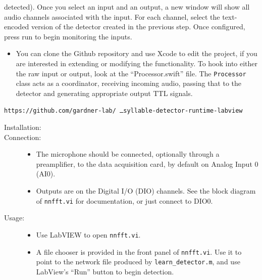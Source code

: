 \documentclass[10pt,letterpaper]{article}
\providecommand{\DIFaddtex}[1]{{\protect\color{blue}\uwave{#1}}} %
\providecommand{\DIFdeltex}[1]{{\protect\color{red}\sout{#1}}}                      %
\providecommand{\DIFaddbegin}{} %
\providecommand{\DIFaddend}{} %
\providecommand{\DIFdelbegin}{} %
\providecommand{\DIFdelend}{} %
\providecommand{\DIFadd}[1]{\texorpdfstring{\DIFaddtex{#1}}{#1}} %
\providecommand{\DIFdel}[1]{\texorpdfstring{\DIFdeltex{#1}}{}} %
\newcommand{\DIFscaledelfig}{0.5}
\newlength{\DIFdelgraphicswidth} %
\newlength{\DIFdelgraphicsheight} %
\newcommand{\DIFaddincludegraphics}[2][]{{\color{blue}\fbox{\DIFOincludegraphics[#1]{#2}}}} %
\newcommand{\DIFdelincludegraphics}[2][]{%
\sbox{\DIFdelgraphicsbox}{\DIFOincludegraphics[#1]{#2}}%
\settoboxwidth{\DIFdelgraphicswidth}{\DIFdelgraphicsbox} %
\settoboxtotalheight{\DIFdelgraphicsheight}{\DIFdelgraphicsbox} %
\scalebox{\DIFscaledelfig}{%
\parbox[b]{\DIFdelgraphicswidth}{\usebox{\DIFdelgraphicsbox}\\[-\baselineskip] \rule{\DIFdelgraphicswidth}{0em}}\llap{\resizebox{\DIFdelgraphicswidth}{\DIFdelgraphicsheight}{%
\setlength{\unitlength}{\DIFdelgraphicswidth}%
\begin{picture}(1,1)%
\thicklines\linethickness{2pt} %
{\color[rgb]{1,0,0}\put(0,0){\framebox(1,1){}}}%
{\color[rgb]{1,0,0}\put(0,0){\line( 1,1){1}}}%
{\color[rgb]{1,0,0}\put(0,1){\line(1,-1){1}}}%
\end{picture}%
}\hspace*{3pt}}} %
} %
\DeclareRobustCommand{\DIFaddbegin}{\DIFOaddbegin \let\includegraphics\DIFaddincludegraphics} %
\DeclareRobustCommand{\DIFaddend}{\DIFOaddend \let\includegraphics\DIFOincludegraphics} %
\DeclareRobustCommand{\DIFdelbegin}{\DIFOdelbegin \let\includegraphics\DIFdelincludegraphics} %
\DeclareRobustCommand{\DIFdelend}{\DIFOaddend \let\includegraphics\DIFOincludegraphics} %
\begin{document}
\begin{description}
\begin{description}
\begin{description}
\begin{itemize}
      detected). Once you select an input and an output, a new window will show all audio 
      channels associated with the input. For each channel, select the text-encoded version of 
      the detector created in the previous step. Once configured, press run to begin 
      monitoring the inputs.
      \end{itemize}
    \item[Customisation:]\hfill
      \begin{itemize}
      \item You can clone the Github repository and use Xcode to edit the project, if you 
      are interested in extending or modifying the functionality. To hook into either 
      the raw input or output, look at the ``Processor.swift'' file. The 
      {\tt Processor} class acts as a coordinator, receiving incoming audio, passing that
      to the detector and generating appropriate output TTL signals.
      \end{itemize}
    \end{description}
    \DIFaddbegin 

  \DIFaddend \item[LabVIEW:]\DIFaddbegin \hfill
    \begin{trivlist}
    \item \DIFaddend {\tt https://github.com/gardner-lab/\DIFdelbegin %
\DIFdel{\ }\DIFdelend syllable-detector-runtime-labview}
    \DIFaddbegin \item \DIFadd{10.5281/zenodo.437558 
    }\end{trivlist}
    \DIFaddend \begin{description}
    \item[Installation:]\hfill
    \item[Connection:]\hfill
      \begin{itemize}
      \item The microphone should be connected, optionally through a preamplifier, to the data acquisition card, by default on Analog Input 0 (AI0).
      \item Outputs are on the Digital I/O (DIO) channels.  See the block diagram of {\tt nnfft.vi} for documentation, or just connect to DIO0.
      \end{itemize}
    \item[Usage:]\hfill
      \begin{itemize}
      \item Use LabVIEW to open {\tt nnfft.vi}.
        \item A file chooser is provided in the front panel of {\tt nnfft.vi}.  Use it to point to the network file
      produced by {\tt learn\_detector.m}, and use LabView's ``Run''
      button to begin detection.
      \end{itemize}
    \end{description}
  \end{description}


\end{description}
\end{document}
